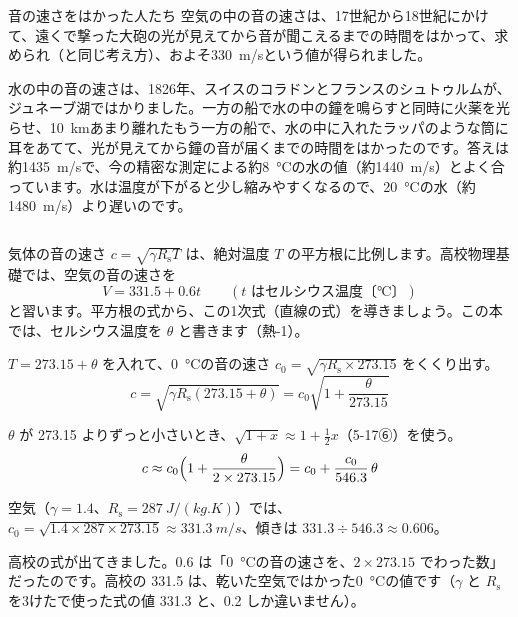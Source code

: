 \begin{column}{音の速さをはかった人たち}
空気の中の音の速さは、17世紀から18世紀にかけて、遠くで撃った大砲の光が見えてから音が聞こえるまでの時間をはかって、求められ（と同じ考え方）、およそ\qty{330}{m/s}という値が得られました。

水の中の音の速さは、1826年、スイスのコラドンとフランスのシュトゥルムが、ジュネーブ湖ではかりました。一方の船で水の中の鐘を鳴らすと同時に火薬を光らせ、\qty{10}{km}あまり離れたもう一方の船で、水の中に入れたラッパのような筒に耳をあてて、光が見えてから鐘の音が届くまでの時間をはかったのです。答えは約\qty{1435}{m/s}で、今の精密な測定による約\qty{8}{\celsius}の水の値（約\qty{1440}{m/s}）とよく合っています。水は温度が下がると少し縮みやすくなるので、\qty{20}{\celsius}の水（約\qty{1480}{m/s}）より遅いのです。
\end{column}


\leavevmode\label{ph:波-9:sec5}気体の音の速さ $c=\sqrt{\gamma R_{\mathrm s}T}$ は、絶対温度 $T$ の平方根に比例します。高校物理基礎では、空気の音の速さを
\[ V=331.5+0.6t\qquad(t\text{ はセルシウス温度〔℃〕}) \]
と習います。平方根の式から、この1次式（直線の式）を導きましょう。この本では、セルシウス温度を $\theta$ と書きます（熱-1）。

\begin{enumerate}[label={\bkcircled[bkBlue]{\arabic*}}, leftmargin=2.4\zw, itemsep=2pt, topsep=2pt]
\item $T=273.15+\theta$ を入れて、\qty{0}{\celsius}の音の速さ $c_0=\sqrt{\gamma R_{\mathrm s}\times273.15}$ をくくり出す。
\[ c=\sqrt{\gamma R_{\mathrm s}(273.15+\theta)}=c_0\sqrt{1+\frac{\theta}{273.15}} \]
\item $\theta$ が 273.15 よりずっと小さいとき、$\sqrt{1+x}\approx1+\tfrac12x$（5-17⑥）を使う。
\[ c\approx c_0\Bigl(1+\frac{\theta}{2\times273.15}\Bigr)=c_0+\frac{c_0}{546.3}\,\theta \]
\item 空気（$\gamma=1.4$、$R_{\mathrm s}=\qty{287}{J/(kg.K)}$）では、$c_0=\sqrt{1.4\times287\times273.15}\approx\qty{331.3}{m/s}$、傾きは $331.3\div546.3\approx0.606$。
\end{enumerate}
\label{ph:波-9:A17}高校の式が出てきました。0.6 は「\qty{0}{\celsius}の音の速さを、$2\times273.15$ でわった数」だったのです。高校の 331.5 は、乾いた空気ではかった\qty{0}{\celsius}の値です（$\gamma$ と $R_{\mathrm s}$ を3けたで使った式の値 331.3 と、0.2 しか違いません）。

